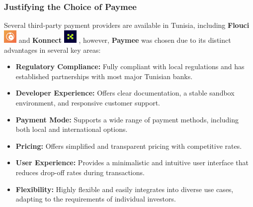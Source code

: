 \subsubsection{Justifying the Choice of Paymee}

Several third-party payment providers are available in Tunisia, including  \textbf{Flouci} \includegraphics[width=0.05\textwidth]{images/icons/flouci_icon.png} and  \textbf{Konnect} \includegraphics[width=0.05\textwidth]{images/icons/konnect_icon.png} , however, \textbf{Paymee} was chosen due to its distinct advantages in several key areas:

\begin{itemize}
  \item \textbf{Regulatory Compliance:} Fully compliant with local regulations and has established partnerships with most major Tunisian banks.
  
  \item \textbf{Developer Experience:} Offers clear documentation, a stable sandbox environment, and responsive customer support.
  
  \item \textbf{Payment Mode:} Supports a wide range of payment methods, including both local and international options.
  
  \item \textbf{Pricing:} Offers simplified and transparent pricing with competitive rates.
  
  \item \textbf{User Experience:} Provides a minimalistic and intuitive user interface that reduces drop-off rates during transactions.
  
  \item \textbf{Flexibility:} Highly flexible and easily integrates into diverse use cases, adapting to the requirements of individual investors.
\end{itemize}

